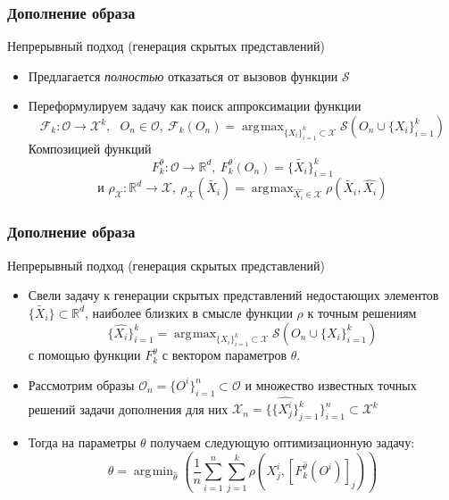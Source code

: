 \documentclass[10pt]{beamer}
\DeclareMathOperator*{\argmax}{\arg\!\max}
\DeclareMathOperator*{\argmin}{\arg\!\min}
\begin{document}
\begin{frame}
	\frametitle{Дополнение образа}
	\begin{block}{Непрерывный подход (генерация скрытых представлений)}
		\begin{itemize}
			\item Предлагается \textit{полностью} отказаться от вызовов функции $\mathcal{S}$
			\item Переформулируем задачу как поиск аппроксимации функции 
			$$\mathcal{F}_k: \mathcal{O}\longrightarrow \mathcal{X}^k, ~~~O_n\in \mathcal{O},~ \mathcal{F}_k(O_n) = \argmax_{\{X_i\}_{i=1}^k\subset\mathcal{X}} \mathcal{S}\left(O_n\cup\{X_i\}_{i=1}^k\right)$$
			Композицией функций 
			$$F_k^\theta: \mathcal{O}\longrightarrow \mathbb{R}^d, ~F_k^\theta(O_n) = \{\tilde{X_i}\}_{i=1}^k$$
			$$\text{и }\rho_\mathcal{X}: \mathbb{R}^d\longrightarrow \mathcal{X}, ~ \rho_\mathcal{X}(\tilde{X_i}) = \argmax_{\hat{X_i}\in\mathcal{X}}\rho(\tilde{X_i}, \hat{X_i})$$
		\end{itemize}
	\end{block}
\end{frame}


\begin{frame}
	\frametitle{Дополнение образа}
	\begin{block}{Непрерывный подход (генерация скрытых представлений)}
		\begin{itemize}
			\item Свели задачу к генерации скрытых представлений недостающих элементов $\{\tilde{X_i}\}\subset \mathbb{R}^d$, наиболее близких в смысле функции $\rho$ к точным решениям
			$$\{\hat{X_i}\}_{i=1}^k= \argmax_{\{X_i\}_{i=1}^k\subset\mathcal{X}} \mathcal{S}\left(O_n\cup\{X_i\}_{i=1}^k\right)$$
			с помощью функции  $F_k^\theta$ с вектором параметров $\theta$. 
			\item Рассмотрим образы $\mathcal{O}_n = \{O^i\}_{i=1}^n \subset\mathcal{O}$ и множество известных точных решений задачи дополнения для них $\mathcal{X}_n =\{\{\hat{X_j^i}\}_{j=1}^k\}_{i=1}^n\subset\mathcal{X}^k$
			\item Тогда на параметры $\theta$ получаем следующую оптимизационную задачу:
			$$\theta = \argmin_{\hat{\theta}}\left( \frac{1}{n}\sum_{i=1}^n\sum_{j=1}^k\rho\left(X_j^i, [F_k^{\hat{\theta}}(O^i)]_j\right)\right)$$
		\end{itemize}
\end{block}
\end{frame}
\end{document}
